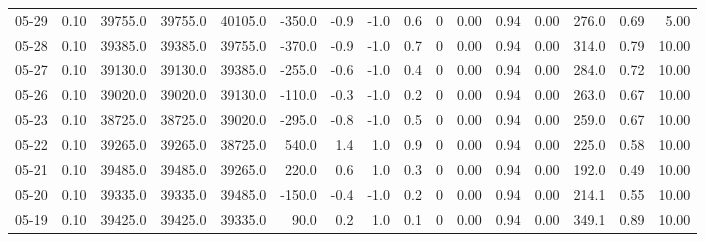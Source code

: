 \begin{threeparttable}
{\begin{tabular}{lrrrrrrrrrrrrrrr}
  05-29 &     0.10 & 39755.0 & 39755.0 & 40105.0 &     -350.0 &           -0.9 &                     -1.0 &                 0.6 &              0 &       0.00 &      0.94 &           0.00 &            276.0 &            0.69 &                   5.00 \\
  05-28 &     0.10 & 39385.0 & 39385.0 & 39755.0 &     -370.0 &           -0.9 &                     -1.0 &                 0.7 &              0 &       0.00 &      0.94 &           0.00 &            314.0 &            0.79 &                  10.00 \\
  05-27 &     0.10 & 39130.0 & 39130.0 & 39385.0 &     -255.0 &           -0.6 &                     -1.0 &                 0.4 &              0 &       0.00 &      0.94 &           0.00 &            284.0 &            0.72 &                  10.00 \\
  05-26 &     0.10 & 39020.0 & 39020.0 & 39130.0 &     -110.0 &           -0.3 &                     -1.0 &                 0.2 &              0 &       0.00 &      0.94 &           0.00 &            263.0 &            0.67 &                  10.00 \\
  05-23 &     0.10 & 38725.0 & 38725.0 & 39020.0 &     -295.0 &           -0.8 &                     -1.0 &                 0.5 &              0 &       0.00 &      0.94 &           0.00 &            259.0 &            0.67 &                  10.00 \\
  05-22 &     0.10 & 39265.0 & 39265.0 & 38725.0 &      540.0 &            1.4 &                      1.0 &                 0.9 &              0 &       0.00 &      0.94 &           0.00 &            225.0 &            0.58 &                  10.00 \\
  05-21 &     0.10 & 39485.0 & 39485.0 & 39265.0 &      220.0 &            0.6 &                      1.0 &                 0.3 &              0 &       0.00 &      0.94 &           0.00 &            192.0 &            0.49 &                  10.00 \\
  05-20 &     0.10 & 39335.0 & 39335.0 & 39485.0 &     -150.0 &           -0.4 &                     -1.0 &                 0.2 &              0 &       0.00 &      0.94 &           0.00 &            214.1 &            0.55 &                  10.00 \\
  05-19 &     0.10 & 39425.0 & 39425.0 & 39335.0 &       90.0 &            0.2 &                      1.0 &                 0.1 &              0 &       0.00 &      0.94 &           0.00 &            349.1 &            0.89 &                  10.00 \\

\end{tabular}}
\end{threeparttable}
